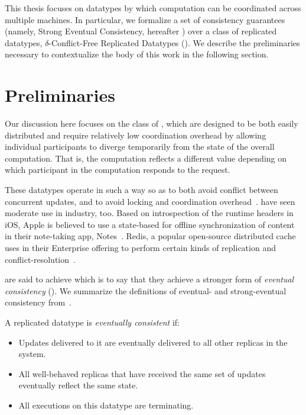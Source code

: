 This thesis focuses on datatypes by which computation can be coordinated across
multiple machines. In particular, we formalize a set of consistency guarantees
(namely, Strong Eventual Consistency, hereafter \SEC) over a class of replicated
datatypes, $\delta$-Conflict-Free Replicated Datatypes (\CRDTs). We describe the
preliminaries necessary to contextualize the body of this work in the following
section.

\section{Preliminaries}
Our discussion here focuses on the class of \CRDTs, which are designed to be
both easily distributed and require relatively low coordination overhead by
allowing individual participants to diverge temporarily from the state of the
overall computation. That is, the computation reflects a different value
depending on which participant in the computation responds to the request.

These datatypes operate in such a way so as to both avoid conflict between
concurrent updates, and to avoid locking and coordination
overhead~\citep{shapiro11}. \CRDTs have seen moderate use in industry, too.
Based on introspection of the runtime headers in iOS, Apple is believed to use a
state-based \CRDT for offline synchronization of content in their note-taking
app, Notes~\citep{applenotes}.  Redis, a popular open-source distributed cache
uses \CRDTs in their Enterprise offering to perform certain kinds of replication
and conflict-resolution~\citep{redis}.

\CRDTs are said to achieve \SEC which is to say that they achieve a stronger
form of \textit{eventual consistency} (\EC). We summarize the definitions of
eventual- and strong-eventual consistency from~\cite{shapiro11}.

\begin{definition}
  \label{def:eventual-consistency}
  A replicated datatype is \emph{eventually consistent} if:
  \begin{itemize}
    \item Updates delivered to it are eventually delivered to all other replicas
      in the system.
    \item All well-behaved replicas that have received the same set of updates
      eventually reflect the same state.
    \item All executions on this datatype are terminating.
  \end{itemize}
\end{definition}

